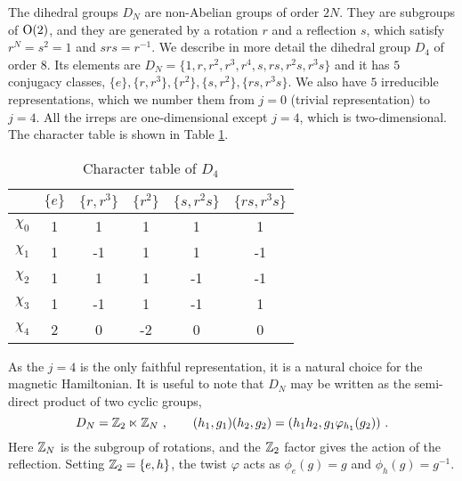 The dihedral groups $D_N$ are non-Abelian groups of order $2N$.
They are subgroups of $\mathrm{O}(2)$, and they are generated by a rotation $r$ and a reflection $s$, which satisfy $r^N=s^2=1$ and $srs = r^{-1}$.
We describe in more detail the dihedral group $D_4$ of order $8$.
Its elements are $D_N = \{1, r, r^2, r^3, r^4, s, r s, r^2 s, r^3 s \}$ and it has $5$ conjugacy classes, $\{e\},\{r,r^3\},\{r^2\},\{s,r^2\},\{rs,r^3s\}$.
We also have $5$ irreducible representations, which we number them from $j=0$ (trivial representation) to $j=4$.
All the irreps are one-dimensional except $j=4$, which is two-dimensional.
The character table is shown in Table \ref{tab:char}.
\begin{table}[h]
    \centering
    \begin{tabular}{c|c|c|c|c|c}
     & $\{e\}$&$\{r,r^3\}$&$\{r^2\}$&$\{s,r^2s\}$&$\{rs,r^3s\}$ \\
         \hline
    $\chi_0 $ & 1 & 1 & 1 & 1 & 1\\
    $\chi_1 $ & 1 & -1 & 1 & 1 & -1\\
    $\chi_2 $ & 1 & 1 & 1 & -1 & -1\\
    $\chi_3 $ & 1 & -1 & 1 & -1 & 1\\
    $\chi_4 $ & 2 & 0 & -2 & 0 & 0
    \end{tabular}
    \caption{Character table of $D_4$}
    \label{tab:char}
    \vspace{-3mm}
\end{table}
As the $j=4$ is the only faithful representation, it is a natural choice for the magnetic Hamiltonian.
It is useful to note that $D_N$ may be written as the semi-direct product of two cyclic groups,
\begin{equation}
    \label{eq:semidirect product}
    D_N = \mathbb{Z}_2 \ltimes \mathbb{Z}_N \ , \quad \quad (h_1,g_1) (h_2,g_2) = (h_1h_2, g_1\varphi_{h_1}(g_2)) \ .
\end{equation}
Here $\mathbb{Z}_N$ is the subgroup of rotations, and the $\mathbb{Z}_2$ factor gives the action of the reflection.
Setting $\mathbb{Z}_2 = \{e, h\}$, the twist $\varphi$ acts as $\phi_e(g)=g$ and $\phi_h(g)=g^{-1}$.
